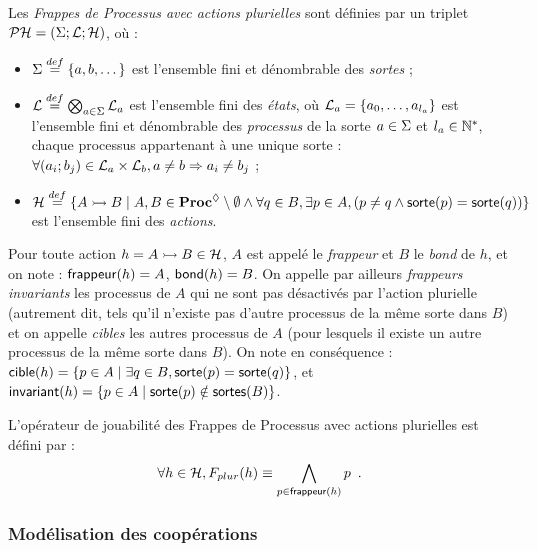 \begin{definition}
  Les \emph{Frappes de Processus avec actions plurielles} sont définies
  par un triplet $\mathcal{PH} = (\Sigma; \mathcal{L}; \mathcal{H})$, où :
  \begin{itemize}
    \item $\Sigma \stackrel{def}= \{a, b, \dots\}$ est l'ensemble fini et dénombrable des \emph{sortes} ;
    \item $\mathcal{L} \stackrel{def}= \bigotimes_{a \in \Sigma} \mathcal{L}_a$ est l'ensemble fini des \emph{états},
      où $\mathcal{L}_a = \{a_0, \ldots, a_{l_a}\}$ est l'ensemble fini et dénombrable
      des \emph{processus} de la sorte $a \in \Sigma$ et $l_a \in \mathbb{N}^*$,
      chaque processus appartenant à une unique sorte :
      $\forall (a_i; b_j) \in \mathcal{L}_a \times \mathcal{L}_b, a \neq b \Rightarrow a_i \neq b_j$ ;
    \item $\mathcal{H} \stackrel{def}= \{\mbox{$A \rightarrowtail B$} \mid A, B \in \mathbf{Proc}^{\lozenge} \setminus \emptyset \wedge
      \forall q \in B, \exists p \in A, (p \neq q \wedge \mathsf{sorte}(p) = \mathsf{sorte}(q)) \}$
      est l'ensemble fini des \emph{actions}.
  \end{itemize}
\end{definition}
%
\noindent
Pour toute action $h = \mbox{$A \rightarrowtail B$} \in \mathcal{H}$,
$A$ est appelé le \emph{frappeur} et $B$ le \emph{bond} de $h$,
et on note : $\mathsf{frappeur}(h) = A$, $\mathsf{bond}(h) = B$.
On appelle par ailleurs \emph{frappeurs invariants} les processus de $A$
qui ne sont pas désactivés par l'action plurielle
(autrement dit, tels qu'il n'existe pas d'autre processus de la même sorte dans $B$)
et on appelle \emph{cibles} les autres processus de $A$
(pour lesquels il existe un autre processus de la même sorte dans $B$).
On note en conséquence :
$\mathsf{cible}(h) = \{ p \in A \mid \exists q \in B, \mathsf{sorte}(p) = \mathsf{sorte}(q) \}$,
et $\mathsf{invariant}(h) = \{ p \in A \mid \mathsf{sorte}(p) \notin \mathsf{sortes}(B) \}$.

\begin{definition}
  L'opérateur de jouabilité des Frappes de Processus avec actions plurielles est défini par :
  \[\forall h \in \mathcal{H}, F_{plur}(h) \equiv \bigwedge_{p \in \mathsf{frappeur}(h)} p \enspace.\]
\end{definition}


\subsubsection*{Modélisation des coopérations}


